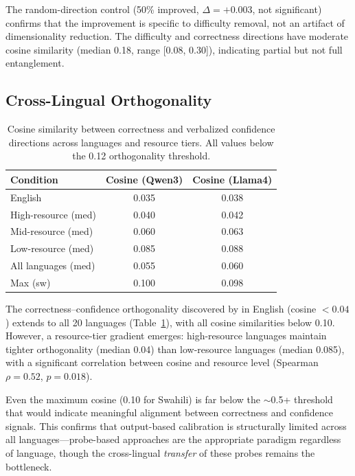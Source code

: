\documentclass[11pt,a4paper]{article}
\begin{document}
The random-direction control (50\% improved, $\Delta = +0.003$, not significant) confirms that the improvement is specific to difficulty removal, not an artifact of dimensionality reduction. The difficulty and correctness directions have moderate cosine similarity (median 0.18, range [0.08, 0.30]), indicating partial but not full entanglement.

\subsection{Cross-Lingual Orthogonality}
\label{sec:orthogonality}

\begin{table}[t]
\centering
\small
\caption{Cosine similarity between correctness and verbalized confidence directions across languages and resource tiers. All values below the 0.12 orthogonality threshold.}
\label{tab:orthogonality}
\begin{tabular}{lcc}
\toprule
\textbf{Condition} & \textbf{Cosine (Qwen3)} & \textbf{Cosine (Llama4)} \\
\midrule
English & 0.035 & 0.038 \\
\midrule
High-resource (med) & 0.040 & 0.042 \\
Mid-resource (med) & 0.060 & 0.063 \\
Low-resource (med) & 0.085 & 0.088 \\
\midrule
All languages (med) & 0.055 & 0.060 \\
Max (sw) & 0.100 & 0.098 \\
\bottomrule
\end{tabular}
\end{table}

The correctness--confidence orthogonality discovered by \citet{miao2026orthogonality} in English (cosine $< 0.04$) extends to all 20 languages (Table~\ref{tab:orthogonality}), with all cosine similarities below 0.10. However, a resource-tier gradient emerges: high-resource languages maintain tighter orthogonality (median 0.04) than low-resource languages (median 0.085), with a significant correlation between cosine and resource level (Spearman $\rho = 0.52$, $p = 0.018$).

Even the maximum cosine (0.10 for Swahili) is far below the $\sim$0.5+ threshold that would indicate meaningful alignment between correctness and confidence signals. This confirms that output-based calibration is structurally limited across all languages---probe-based approaches are the appropriate paradigm regardless of language, though the cross-lingual \emph{transfer} of these probes remains the bottleneck.
\end{document}
